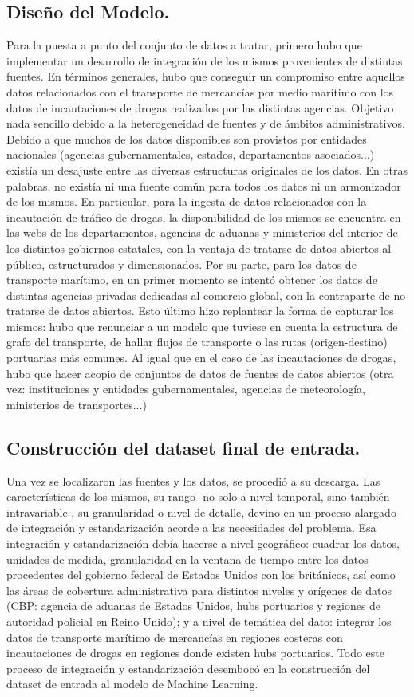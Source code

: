 \documentclass{article}
\begin{document}
\subsection{Diseño del Modelo.}
Para la puesta a punto del conjunto de datos a tratar, primero hubo que implementar un desarrollo de integración de los mismos provenientes de distintas fuentes.
En términos generales, hubo que conseguir un compromiso entre aquellos datos relacionados con el transporte de mercancías por medio marítimo con los datos de incautaciones de drogas realizados por las distintas agencias. Objetivo nada sencillo debido a la heterogeneidad de fuentes y de ámbitos administrativos. Debido a que muchos de los datos disponibles son provistos por entidades nacionales (agencias gubernamentales, estados, departamentos asociados...) existía un desajuste entre las diversas estructuras originales de los datos. En otras palabras, no existía ni una fuente común para todos los datos ni un armonizador de los mismos. En particular, para la ingesta de datos relacionados con la incautación de tráfico de drogas, la disponibilidad de los mismos se encuentra en las webs de los departamentos, agencias de aduanas y ministerios del interior de los distintos gobiernos estatales, con la ventaja de tratarse de datos abiertos al público, estructurados y dimensionados. Por su parte, para los datos de transporte marítimo, en un primer momento se intentó obtener los datos de distintas agencias privadas dedicadas al comercio global, con la contraparte de no tratarse de datos abiertos. Esto último hizo replantear la forma de capturar los mismos: hubo que renunciar a un modelo que tuviese en cuenta la estructura de grafo del transporte, de hallar flujos de transporte o las rutas (origen-destino) portuarias más comunes. Al igual que en el caso de las incautaciones de drogas, hubo que hacer acopio de conjuntos de datos de fuentes de datos abiertos (otra vez: instituciones y entidades gubernamentales, agencias de meteorología, ministerios de transportes...)

\subsection{Construcción del dataset final de entrada.}
Una vez se localizaron las fuentes y los datos, se procedió a su descarga. Las características de los mismos, su rango -no solo a nivel temporal, sino también intravariable-, su granularidad o nivel de detalle, devino en un proceso alargado de integración y estandarización acorde a las necesidades del problema. Esa integración y estandarización debía hacerse a nivel geográfico: cuadrar los datos, unidades de medida, granularidad en la ventana de tiempo entre los datos procedentes del gobierno federal de Estados Unidos con los británicos, así como las áreas de cobertura administrativa para distintos niveles y orígenes de datos (CBP: agencia de aduanas de Estados Unidos, hubs portuarios y regiones de autoridad policial en Reino Unido); y a nivel de temática del dato: integrar los datos de transporte marítimo de mercancías en regiones costeras con incautaciones de drogas en regiones donde existen hubs portuarios. Todo este proceso de integración y estandarización desembocó en la construcción del dataset de entrada al modelo de Machine Learning.
\end{document}
